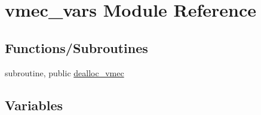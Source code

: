 \hypertarget{namespacevmec__vars}{}\section{vmec\+\_\+vars Module Reference}
\label{namespacevmec__vars}
\subsection*{Functions/\+Subroutines}
\begin{DoxyCompactItemize}
\item 
subroutine, public \hyperlink{namespacevmec__vars_ace63f2f143043b860f7705dff7089676}{dealloc\+\_\+vmec}
\end{DoxyCompactItemize}
\subsection*{Variables}
